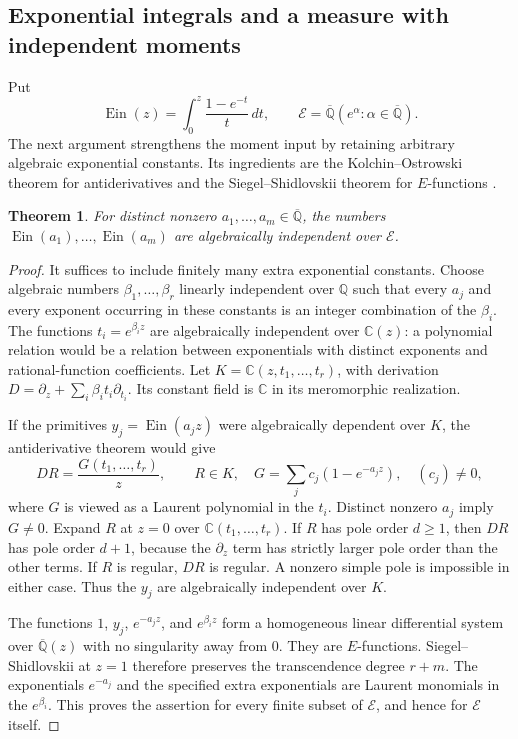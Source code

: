 \documentclass[11pt,a4paper]{article}
\newtheorem{theorem}{Theorem}[section]
\theoremstyle{definition}
\theoremstyle{remark}
\numberwithin{equation}{section}
\newcommand{\Qbar}{\overline{\mathbb Q}}
\DeclareMathOperator{\Ein}{Ein}
\begin{document}
\subsection{Exponential integrals and a measure with independent moments}
\label{tf-ein-section}

Put
\[
 \Ein(z)=\int_0^z\frac{1-e^{-t}}t\,dt,
 \qquad \mathcal E=\Qbar(e^\alpha:\alpha\in\Qbar).
\]
The next argument strengthens the moment input by retaining arbitrary
algebraic exponential constants.  Its ingredients are the
Kolchin--Ostrowski theorem for antiderivatives and the
Siegel--Shidlovskii theorem for $E$-functions
\cite{tf-srinivasan,tf-fischler-rivoal}.

\begin{theorem}\label{tf-ein}
For distinct nonzero $a_1,\ldots,a_m\in\Qbar$, the numbers
$\Ein(a_1),\ldots,\Ein(a_m)$ are algebraically independent over
$\mathcal E$.
\end{theorem}
\begin{proof}
It suffices to include finitely many extra exponential constants.
Choose algebraic numbers $\beta_1,\ldots,\beta_r$ linearly independent over
$\mathbb Q$ such that every $a_j$ and every exponent occurring in these
constants is an integer combination of the $\beta_i$.  The functions
$t_i=e^{\beta_i z}$ are algebraically independent over $\mathbb C(z)$:
a polynomial relation would be a relation between exponentials with
distinct exponents and rational-function coefficients.  Let
$K=\mathbb C(z,t_1,\ldots,t_r)$, with derivation
$D=\partial_z+\sum_i\beta_i t_i\partial_{t_i}$.
Its constant field is $\mathbb C$ in its meromorphic realization.

If the primitives $y_j=\Ein(a_jz)$ were algebraically dependent over $K$,
the antiderivative theorem would give
\[
 DR=\frac{G(t_1,\ldots,t_r)}z,\qquad R\in K,
 \quad G=\sum_j c_j(1-e^{-a_jz}),\quad(c_j)\ne0,
\]
where $G$ is viewed as a Laurent polynomial in the $t_i$.
Distinct nonzero $a_j$ imply $G\ne0$.  Expand $R$ at $z=0$ over
$\mathbb C(t_1,\ldots,t_r)$.  If $R$ has pole order $d\ge1$, then
$DR$ has pole order $d+1$, because the $\partial_z$ term has strictly
larger pole order than the other terms.  If $R$ is regular, $DR$ is
regular.  A nonzero simple pole is impossible in either case.
Thus the $y_j$ are algebraically independent over $K$.

The functions $1$, $y_j$, $e^{-a_jz}$, and $e^{\beta_i z}$ form a
homogeneous linear differential system over $\Qbar(z)$ with no singularity
away from $0$.  They are $E$-functions.  Siegel--Shidlovskii at $z=1$
therefore preserves the transcendence degree $r+m$.  The exponentials
$e^{-a_j}$ and the specified extra exponentials are Laurent monomials
in the $e^{\beta_i}$.  This proves the assertion for every finite subset
of $\mathcal E$, and hence for $\mathcal E$ itself.
\end{proof}
\end{document}
